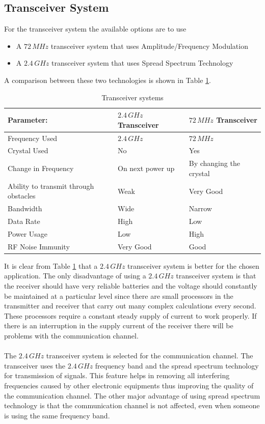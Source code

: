\subsection{Transceiver System}
%
For the transceiver system the available options are to use
%
\begin{itemize}
\item A $72\,MHz$ transceiver system that uses Amplitude/Frequency Modulation
\item A $2.4\,GHz$ transceiver system that uses Spread Spectrum Technology
\end{itemize}
%
A comparison between these two technologies is shown in Table \ref{tab:transceiver}.
%
\begin{table}
\centering
\caption{Transceiver systems}
\label{tab:transceiver}
\begin{tabular}{|l l l|}
\hline
\textbf{Parameter:} &  \textbf{$2.4\,GHz$ Transceiver} & \textbf{$72\,MHz$ Transceiver}\\ 
\hline
Frequency Used & $2.4\,GHz$ & $72\,MHz$ \\
Crystal Used & No & Yes \\
Change in Frequency & On next power up & By changing the crystal \\
Ability to transmit through obstacles & Weak & Very Good\\
Bandwidth & Wide & Narrow\\
Data Rate & High & Low\\
Power Usage & Low & High\\
RF Noise Immunity & Very Good & Good \\
\hline
\end{tabular}
\end{table}
%
It is clear from Table \ref{tab:transceiver} that a $2.4\,GHz$ transceiver system is better for the chosen application. The only disadvantage of using a $2.4\,GHz$ transceiver system is that the receiver should have very reliable batteries and the voltage should constantly be maintained at a particular level since there are small processors in the transmitter and receiver that carry out many complex calculations every second. These processors require a constant steady supply of current to work properly. If there is an interruption in the supply current of the receiver there will be problems with the communication channel.
\\
\\
The $2.4\,GHz$ transceiver system is selected for the communication channel. The transceiver uses the $2.4\,GHz$ frequency band and the spread spectrum technology for transmission of signals. This feature helps in removing all interfering frequencies caused by other electronic equipments thus improving the quality of the communication channel. The other major advantage of using spread spectrum technology is that the communication channel is not affected, even when someone is using the same frequency band.
%
